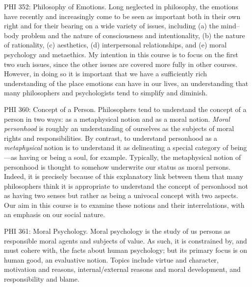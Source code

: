 \documentclass[%
  11pt,%
]{article}
\begin{document}
\begin{htmlcourse}{PHI 352: Philosophy of Emotions.}
  Long neglected in philosophy, the emotions have recently and increasingly come to be seen as important both in their own right and for their bearing on a wide variety of issues, including (a) the mind--body problem and the nature of consciousness and intentionality, (b) the nature of rationality, (c) aesthetics, (d) interpersonal relationships, and (e) moral psychology and metaethics. My intention in this course is to focus on the first two such issues, since the other issues are covered more fully in other courses. However, in doing so it is important that we have a sufficiently rich understanding of the place emotions can have in our lives, an understanding that many philosophers and psychologists tend to simplify and diminish.
\end{htmlcourse}

\begin{htmlcourse}{PHI 360: Concept of a Person.}
  Philosophers tend to understand the concept of a person in two ways: as a metaphysical notion and as a moral notion. \emph{Moral personhood} is roughly an understanding of ourselves as the subjects of moral rights and responsibilities. By contrast, to understand personhood as a \emph{metaphysical} notion is to understand it as delineating a special category of being---as having or being a soul, for example. Typically, the metaphysical notion of personhood is thought to somehow underwrite our status as moral persons. Indeed, it is precisely because of this explanatory link between them that many philosophers think it is appropriate to understand the concept of personhood not as having two senses but rather as being a univocal concept with two aspects. Our aim in this course is to examine these notions and their interrelations, with an emphasis on our social nature.
\end{htmlcourse}

\begin{htmlcourse}{PHI 361: Moral Psychology.}
  Moral psychology is the study of us persons as responsible moral agents and subjects of value. As such, it is constrained by, and must cohere with, the facts about human psychology; but its primary focus is on human good, an evaluative notion. Topics include virtue and character, motivation and reasons, internal/external reasons and moral development, and responsibility and blame.
\end{htmlcourse}
\end{document}
